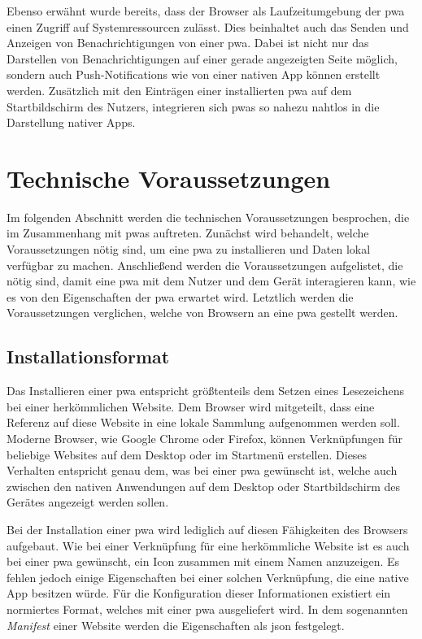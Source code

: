 \documentclass[12pt, parskip=half]{scrartcl}       %
\begin{document}
Ebenso erwähnt wurde bereits, dass der Browser als Laufzeitumgebung der \ac{pwa} einen Zugriff auf Systemressourcen zulässt.
Dies beinhaltet auch das Senden und Anzeigen von Benachrichtigungen von einer \ac{pwa}.
Dabei ist nicht nur das Darstellen von Benachrichtigungen auf einer gerade angezeigten Seite möglich, sondern auch Push-Notifications wie von einer nativen App können erstellt werden.
Zusätzlich mit den Einträgen einer installierten \ac{pwa} auf dem Startbildschirm des Nutzers, integrieren sich \acp{pwa} so nahezu nahtlos in die Darstellung nativer Apps.


\section{Technische Voraussetzungen}
\label{sec:voraussetzung}

Im folgenden Abschnitt werden die technischen Voraussetzungen besprochen, die im Zusammenhang mit \acp{pwa} auftreten.
Zunächst wird behandelt, welche Voraussetzungen nötig sind, um eine \ac{pwa} zu installieren und Daten lokal verfügbar zu machen.
Anschließend werden die Voraussetzungen aufgelistet, die nötig sind, damit eine \ac{pwa} mit dem Nutzer und dem Gerät interagieren kann, wie es von den Eigenschaften der \ac{pwa} erwartet wird.
Letztlich werden die Voraussetzungen verglichen, welche von Browsern an eine \ac{pwa} gestellt werden.

\subsection{Installationsformat}

Das Installieren einer \ac{pwa} entspricht größtenteils dem Setzen eines Lesezeichens bei einer herkömmlichen Website.
Dem Browser wird mitgeteilt, dass eine Referenz auf diese Website in eine lokale Sammlung aufgenommen werden soll.
Moderne Browser, wie Google Chrome oder Firefox, können Verknüpfungen für beliebige Websites auf dem Desktop oder im Startmenü erstellen\cite{mozillasupport_desktopshortcut}\cite{businessinsider_desktopshortcut_chrome}.
Dieses Verhalten entspricht genau dem, was bei einer \ac{pwa} gewünscht ist, welche auch zwischen den nativen Anwendungen auf dem Desktop oder Startbildschirm des Gerätes angezeigt werden sollen.

Bei der Installation einer \ac{pwa} wird lediglich auf diesen Fähigkeiten des Browsers aufgebaut.
Wie bei einer Verknüpfung für eine herkömmliche Website ist es auch bei einer \ac{pwa} gewünscht, ein Icon zusammen mit einem Namen anzuzeigen.
Es fehlen jedoch einige Eigenschaften bei einer solchen Verknüpfung, die eine native App besitzen würde.
Für die Konfiguration dieser Informationen existiert ein normiertes Format, welches mit einer \ac{pwa} ausgeliefert wird.
In dem sogenannten \textit{Manifest} einer Website werden die Eigenschaften als \ac{json} festgelegt.
\end{document}
